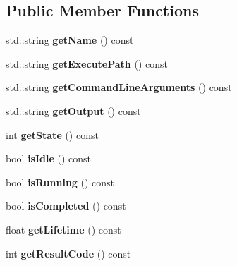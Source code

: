 \subsection*{Public Member Functions}
\begin{DoxyCompactItemize}
\item 
\mbox{\label{classPlayerTask_afaedd200f1876f8efbf4f6059238d69c}} 
std\+::string {\bfseries get\+Name} () const
\item 
\mbox{\label{classPlayerTask_aad12ef0725eaca21eda74dc4ebace746}} 
std\+::string {\bfseries get\+Execute\+Path} () const
\item 
\mbox{\label{classPlayerTask_a4f5be937b908196e00e201cbcf4ed6b1}} 
std\+::string {\bfseries get\+Command\+Line\+Arguments} () const
\item 
\mbox{\label{classPlayerTask_a009307953a06883eab6592f157fa1f60}} 
std\+::string {\bfseries get\+Output} () const
\item 
\mbox{\label{classPlayerTask_ab4619cf10e710aff6247b663c63ea142}} 
int {\bfseries get\+State} () const
\item 
\mbox{\label{classPlayerTask_ae83d64a140fd71f95d2a506a15793472}} 
bool {\bfseries is\+Idle} () const
\item 
\mbox{\label{classPlayerTask_ae0fc408de7dc1b8e159aa2e1d6bd264e}} 
bool {\bfseries is\+Running} () const
\item 
\mbox{\label{classPlayerTask_a88fe4e69d88c6a4c344ccf2cfe184d0d}} 
bool {\bfseries is\+Completed} () const
\item 
\mbox{\label{classPlayerTask_ab121eca893d0355b1ab1aca54b3958d4}} 
float {\bfseries get\+Lifetime} () const
\item 
\mbox{\label{classPlayerTask_abe7dc418af85b70defd8277b82be3434}} 
int {\bfseries get\+Result\+Code} () const
\item 
\mbox{\label{classPlayerTask_a148643b29de4d5f87438a6feef0fa7a9}} 

\end{DoxyCompactItemize}
